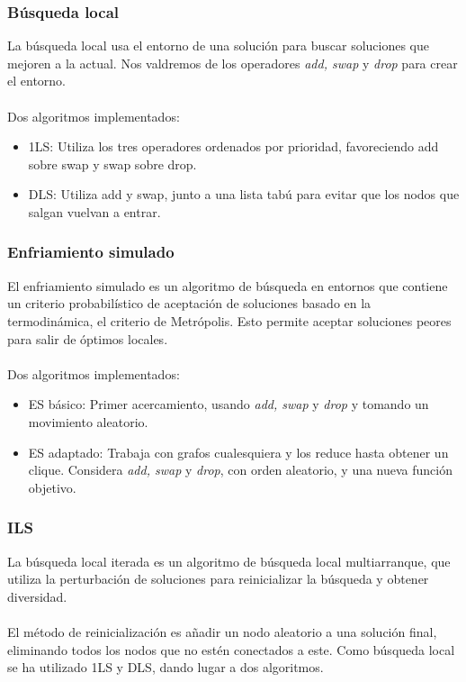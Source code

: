 \documentclass{beamer}
\begin{document}
\begin{frame}
  \frametitle{Búsqueda local}
   La búsqueda local usa el entorno de una solución para buscar soluciones que mejoren a la actual.
   Nos valdremos de los operadores \textit{add, swap} y \textit{drop} para crear el entorno. \\~\\

  Dos algoritmos implementados:
  \begin{itemize}
    \item 1LS: Utiliza los tres operadores ordenados por prioridad, favoreciendo add sobre swap y swap sobre drop.
    \item DLS: Utiliza add y swap, junto a una lista tabú para evitar que los nodos que salgan vuelvan a entrar.
  \end{itemize}

\end{frame}


\begin{frame}
  \frametitle{Enfriamiento simulado}
   El enfriamiento simulado es un algoritmo de búsqueda en entornos que contiene un criterio probabilístico
   de aceptación de soluciones basado en la termodinámica, el criterio de Metrópolis. Esto permite aceptar soluciones
   peores para salir de óptimos locales. \\~\\

  Dos algoritmos implementados:
  \begin{itemize}
    \item ES básico: Primer acercamiento, usando \textit{add, swap} y \textit{drop} y tomando un movimiento aleatorio.
    \item ES adaptado: Trabaja con grafos cualesquiera y los reduce hasta obtener un clique. Considera \textit{add, swap} y \textit{drop},
    con orden aleatorio, y una nueva función objetivo.
  \end{itemize}

\end{frame}


\begin{frame}
  \frametitle{ILS}
   La búsqueda local iterada es un algoritmo de búsqueda local multiarranque, que utiliza la perturbación de soluciones para
   reinicializar la búsqueda y obtener diversidad. \\~\\

   El método de reinicialización es añadir un nodo aleatorio a una solución final, eliminando todos los nodos que no estén
   conectados a este. Como búsqueda local se ha utilizado 1LS y DLS, dando lugar a dos algoritmos.

\end{frame}
\end{document}
